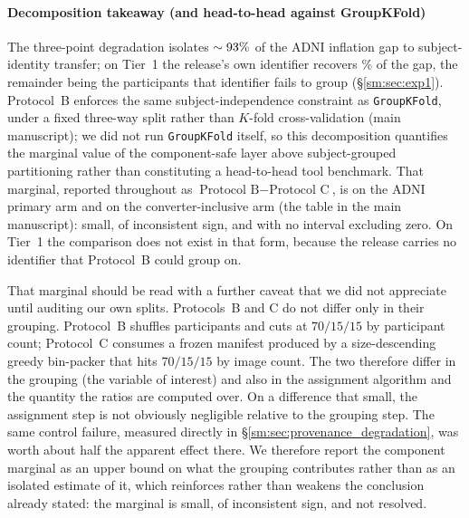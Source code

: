 \documentclass[11pt]{article}
\begin{document}
\paragraph{Decomposition takeaway (and head-to-head against
GroupKFold)}
The three-point degradation isolates $\sim 93\%$ of the ADNI
inflation gap to subject-identity transfer; on Tier~1 the release's
own identifier recovers \TierOneShareFilename\% of the gap, the
remainder being the participants that identifier fails to group
(\S\ref{sm:sec:exp1}). Protocol~B enforces the same
subject-independence constraint as \texttt{GroupKFold}, under a fixed
three-way split rather than $K$-fold cross-validation
(main manuscript); we did not run \texttt{GroupKFold} itself, so
this decomposition quantifies the marginal value of the
component-safe layer above subject-grouped partitioning rather than
constituting a head-to-head tool benchmark. That marginal, reported throughout as
$\text{Protocol B} - \text{Protocol C}$, is \AdniMarginal{}
\AdniMarginalCI{} on the ADNI primary arm and \AdniConvMarginal{} on
the converter-inclusive arm (the table in the main manuscript): small,
of inconsistent sign, and with no interval excluding zero. On Tier~1 the
comparison does not exist in that form, because the release carries no
identifier that Protocol~B could group on.

That marginal should be read with a further caveat that we did not
appreciate until auditing our own splits. Protocols~B and C do not
differ only in their grouping. Protocol~B shuffles participants and
cuts at $70/15/15$ by participant count; Protocol~C consumes a frozen
manifest produced by a size-descending greedy bin-packer that hits
$70/15/15$ by image count. The two therefore differ in the grouping
(the variable of interest) and also in the assignment algorithm
and the quantity the ratios are computed over. On a difference that small, the assignment step is not obviously
negligible relative to the grouping step. The same control failure,
measured directly in \S\ref{sm:sec:provenance_degradation}, was worth
about half the apparent effect there. We therefore report the
component marginal as an upper bound on what the grouping contributes
rather than as an isolated estimate of it, which reinforces rather
than weakens the conclusion already stated: the marginal is small, of
inconsistent sign, and not resolved.
\end{document}
